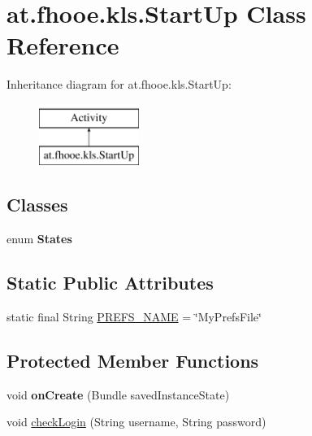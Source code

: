 \hypertarget{classat_1_1fhooe_1_1kls_1_1_start_up}{\section{at.\-fhooe.\-kls.\-Start\-Up Class Reference}
\label{classat_1_1fhooe_1_1kls_1_1_start_up}
}
Inheritance diagram for at.\-fhooe.\-kls.\-Start\-Up\-:\begin{figure}[H]
\begin{center}
\leavevmode
\includegraphics[height=2.000000cm]{classat_1_1fhooe_1_1kls_1_1_start_up}
\end{center}
\end{figure}
\subsection*{Classes}
\begin{DoxyCompactItemize}
\item 
enum {\bfseries States}
\end{DoxyCompactItemize}
\subsection*{Static Public Attributes}
\begin{DoxyCompactItemize}
\item 
static final String \hyperlink{classat_1_1fhooe_1_1kls_1_1_start_up_af655c6452309da7d7021e9a702838b95}{P\-R\-E\-F\-S\-\_\-\-N\-A\-M\-E} = \char`\"{}My\-Prefs\-File\char`\"{}
\end{DoxyCompactItemize}
\subsection*{Protected Member Functions}
\begin{DoxyCompactItemize}
\item 
\hypertarget{classat_1_1fhooe_1_1kls_1_1_start_up_a90c4c16dc009adcfa7b711e7f8a4f365}{void {\bfseries on\-Create} (Bundle saved\-Instance\-State)}\label{classat_1_1fhooe_1_1kls_1_1_start_up_a90c4c16dc009adcfa7b711e7f8a4f365}

\item 
void \hyperlink{classat_1_1fhooe_1_1kls_1_1_start_up_a85f2c9f4d97f99cf0e97daf8a5a32b2b}{check\-Login} (String username, String password)
\end{DoxyCompactItemize}



